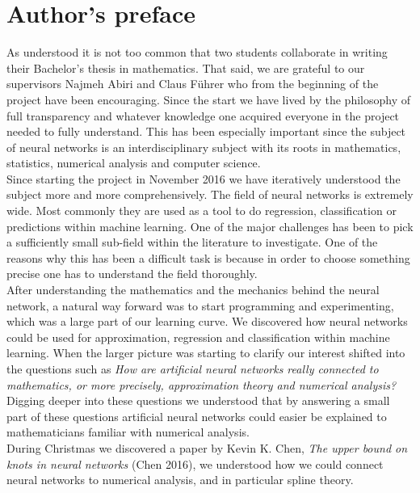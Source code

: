 \documentclass[11pt, letterpaper]{amsart}
\begin{document}
\newpage

\tableofcontents
\newpage

\section*{Author's preface}
As understood it is not too common that two students collaborate in writing their Bachelor's thesis in mathematics. That said, we are grateful to our supervisors Najmeh Abiri and Claus Führer who from the beginning of the project have been encouraging. Since the start we have lived by the philosophy of full transparency and whatever knowledge one acquired everyone in the project needed to fully understand. This has been especially important since the subject of neural networks is an interdisciplinary subject with its roots in mathematics, statistics, numerical analysis and computer science.
\\

Since starting the project in November 2016 we have iteratively understood the subject more and more comprehensively. The field of neural networks is extremely wide. Most commonly they are used as a tool to do regression, classification or predictions within machine learning. One of the major challenges has been to pick a sufficiently small sub-field within the literature to investigate. One of the reasons why this has been a difficult task is because in order to choose something precise one has to understand the field thoroughly.
\\

After understanding the mathematics and the mechanics behind the neural network, a natural way forward was to start programming and experimenting, which was a large part of our learning curve. We discovered how neural networks could be used for approximation, regression and classification within machine learning. When the larger picture was starting to clarify our interest shifted into the questions such as \textit{How are artificial neural networks really connected to mathematics, or more precisely, approximation theory and numerical analysis?} Digging deeper into these questions we understood that by answering a small part of these questions artificial neural networks could easier be explained to mathematicians familiar with numerical analysis.
\\

During Christmas we discovered a paper by Kevin K. Chen, \textit{The upper bound on knots in neural networks} (Chen 2016), we understood how we could connect neural networks to numerical analysis, and in particular spline theory.
\end{document}
